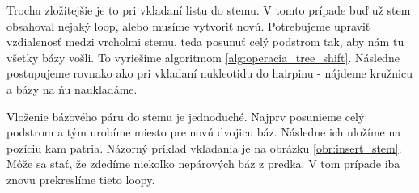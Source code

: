 Trochu zložitejšie je to pri vkladaní listu do stemu. V tomto prípade buď už stem
obsahoval nejaký loop, alebo musíme vytvoriť novú. Potrebujeme upraviť vzdialenosť
medzi vrcholmi stemu, teda posunuť celý podstrom tak, aby nám tu všetky bázy vošli.
To vyriešime algoritmom \ref{alg:operacia_tree_shift}. Následne postupujeme
rovnako ako pri vkladaní nukleotidu do hairpinu - nájdeme kružnicu a bázy
na ňu naukladáme.

Vloženie bázového páru do stemu je jednoduché. Najprv posunieme celý podstrom
a tým urobíme miesto pre novú dvojicu báz. Následne ich uložíme na pozíciu kam patria.
Názorný príklad vkladania je na obrázku \ref{obr:insert_stem}.
Môže sa stať, že zdedíme niekoľko nepárových báz z predka. V tom prípade iba
znovu prekreslíme tieto loopy.


\renewcommand{\wi}{0.45\textwidth}

